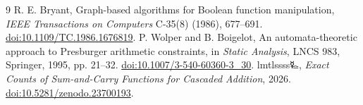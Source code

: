 \documentclass[11pt,a4paper]{article}
\begin{document}
\begin{thebibliography}{9}
R. E. Bryant, Graph-based algorithms for Boolean function manipulation,
\textit{IEEE Transactions on Computers} C-35(8) (1986), 677--691.
\href{https://doi.org/10.1109/TC.1986.1676819}{doi:10.1109/TC.1986.1676819}.
P. Wolper and B. Boigelot, An automata-theoretic approach to Presburger
arithmetic constraints, in \textit{Static Analysis}, LNCS 983,
Springer, 1995, pp. 21--32.
\href{https://doi.org/10.1007/3-540-60360-3_30}{doi:10.1007/3-540-60360-3\_30}.
lmtlssss{\authorsymbol 🜐}, \textit{Exact Counts of Sum-and-Carry Functions
for Cascaded Addition}, 2026.
\href{https://doi.org/10.5281/zenodo.23700193}{doi:10.5281/zenodo.23700193}.
\end{thebibliography}
\end{document}
